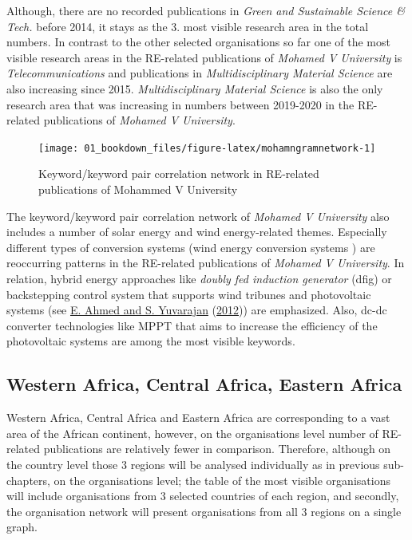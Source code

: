 \documentclass[
]{book}
\begin{document}
Although, there are no recorded publications in \emph{Green and Sustainable Science \& Tech.} before 2014, it stays as the 3. most visible research area in the total numbers. In contrast to the other selected organisations so far one of the most visible research areas in the RE-related publications of \emph{Mohamed V University} is \emph{Telecommunications} and publications in \emph{Multidisciplinary Material Science} are also increasing since 2015. \emph{Multidisciplinary Material Science} is also the only research area that was increasing in numbers between 2019-2020 in the RE-related publications of \emph{Mohamed V University}.

\begin{figure}
\texttt{[image: 01\_bookdown\_files/figure-latex/mohamngramnetwork-1]} \caption{Keyword/keyword pair correlation network in RE-related publications of Mohammed V University}\label{fig:mohamngramnetwork}
\end{figure}

The keyword/keyword pair correlation network of \emph{Mohamed V University} also includes a number of solar energy and wind energy-related themes. Especially different types of conversion systems (wind energy conversion systems ) are reoccurring patterns in the RE-related publications of \emph{Mohamed V University}. In relation, hybrid energy approaches like \emph{doubly fed induction generator} (dfig) or backstepping control system that supports wind tribunes and photovoltaic systems (see \protect\hyperlink{ref-e.ahmed2012}{E. Ahmed and S. Yuvarajan} (\protect\hyperlink{ref-e.ahmed2012}{2012})) are emphasized. Also, dc-dc converter technologies like MPPT that aims to increase the efficiency of the photovoltaic systems are among the most visible keywords.

\hypertarget{western-africa-central-africa-eastern-africa}{%
\subsection{Western Africa, Central Africa, Eastern Africa}\label{western-africa-central-africa-eastern-africa}}

Western Africa, Central Africa and Eastern Africa are corresponding to a vast area of the African continent, however, on the organisations level number of RE-related publications are relatively fewer in comparison. Therefore, although on the country level those 3 regions will be analysed individually as in previous sub-chapters, on the organisations level; the table of the most visible organisations will include organisations from 3 selected countries of each region, and secondly, the organisation network will present organisations from all 3 regions on a single graph.
\end{document}
